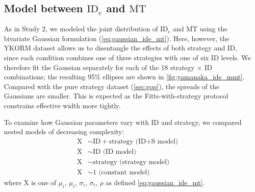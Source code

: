 \documentclass[acmlarge, manuscript,review]{acmart}
\newcommand{\mmt}{\ensuremath{\overline{\mt}}\xspace}
\newcommand{\mt}{\ensuremath{{\text{MT}}}\xspace}
\newcommand{\ide}{\ensuremath{{\text{ID}_e}}\xspace}
\begin{document}



\subsection{Model between \ide and \mmt}
As in Study 2, we modeled the joint distribution of \ide and \mmt using the bivariate Gaussian formulation (\autoref{eq:gaussian_ide_mt}). Here, however, the YKORM dataset allows us to disentangle the effects of both strategy and ID, since each condition combines one of three strategies with one of six ID levels. We therefore fit the Gaussian separately for each of the 18 strategy $\times$ ID combinations; the resulting 95\% ellipses are shown in \autoref{fig:yamanaka_ide_mmt}.
Compared with the pure strategy dataset (\autoref{sec:gop}), the spreads of the Gaussians are smaller. This is expected as the Fitts-with-strategy protocol constrains effective width more tightly.

To examine how Gaussian parameters vary with ID and strategy, we compared nested models of decreasing complexity:
\begin{align}
	\text{X} & \sim \text{ID} + \text{strategy (ID+S model)}  \\
	\text{X} &\sim \text{ID (ID model)} \\
	\text{X} &\sim \text{strategy (strategy model)} \\
	\text{X} &\sim 1 \text{ (constant model)} 
\end{align}
where X is one of $\mu_i$, $\mu_t$, $\sigma_i$, $\sigma_t$, $\rho$ as defined \autoref{eq:gaussian_ide_mt}. 
\end{document}
